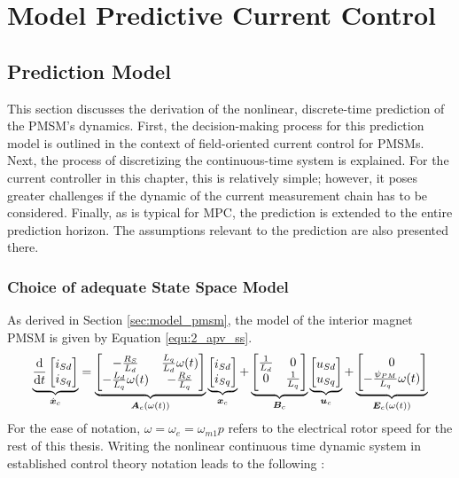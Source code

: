\chapter{Model Predictive Current Control}

\section{Prediction Model}
This section discusses the derivation of the nonlinear, discrete-time prediction of the PMSM’s dynamics. First, the decision-making process for this prediction model is outlined in the context of field-oriented current control for PMSMs. Next, the process of discretizing the continuous-time system is explained. For the current controller in this chapter, this is relatively simple; however, it poses greater challenges if the dynamic of the current measurement chain has to be considered. Finally, as is typical for MPC, the prediction is extended to the entire prediction horizon. The assumptions relevant to the prediction are also presented there.
\subsection{Choice of adequate State Space Model} \label{sec:ss_choice}
As derived in Section \ref{sec:model_pmsm}, the model of the interior magnet PMSM is given by Equation \eqref{equ:2_apv_ss}.
\begin{equation}
	\underbrace{
	\dfrac{\mathrm{d}}{\mathrm{d} t} \begin{bmatrix}
		i_{Sd} \\i_{Sq}
	\end{bmatrix}}_{\Dot{{\bm{x}}}_c}
	= 
	\underbrace{
	\begin{bmatrix}
		-\frac{R_S}{L_d} & \frac{L_q}{L_d} \omega(t)\\ -\frac{L_d}{L_q} \omega(t) & -\frac{R_S}{L_q}
	\end{bmatrix}}_{\bm{A}_c(\omega(t))}
	\underbrace{
	\begin{bmatrix}
		i_{Sd} \\i_{Sq}
	\end{bmatrix}}_{{\bm{x}}_c}
 + 
 	\underbrace{
	\begin{bmatrix}
		\frac{1}{L_d} & 0 \\ 0 & \frac{1}{L_q}
	\end{bmatrix}}_{\bm{B}_c}
	\underbrace{
	\begin{bmatrix}
		u_{Sd} \\u_{Sq}
	\end{bmatrix}}_{\bm{u}_c}
 +
 \underbrace{ 
 \begin{bmatrix}
		0 \\ - \frac{\psi_{PM}}{L_q} \omega(t)
	\end{bmatrix}}_{\bm{E}_c(\omega(t))}
	\label{equ:2_apv_ss}
\end{equation}
For the ease of notation, $\omega = \omega_e = \omega_{m1}p$ refers to the electrical rotor speed for the rest of this thesis. Writing the nonlinear continuous time dynamic system in established control theory\cite{RegelTech} \cite{mpcRawlings} notation leads to the following :

